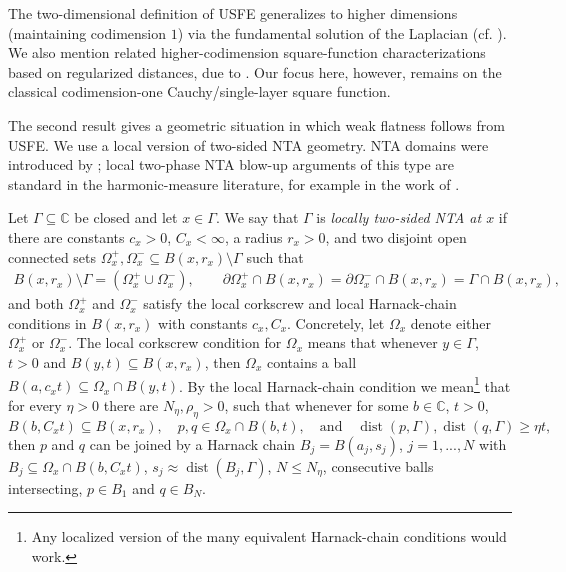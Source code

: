 \documentclass[11pt,a4paper,english,reqno]{amsart}
\numberwithin{equation}{section}
\newcommand{\CC}[0]{\mathbb{C}}
\renewcommand{\subset}{\subseteq}
\DeclareMathOperator{\dist}{dist}
\numberwithin{definition}{section}
\begin{document}
The two-dimensional definition of USFE generalizes to higher dimensions (maintaining codimension $1$) via the fundamental solution of the Laplacian (cf. \cite[Definition I.2.38]{davidAnalysisUniformlyRectifiable1993}).
We also mention related higher-codimension square-function characterizations based on regularized distances, due to \citeauthor{davidSquareFunctionsNontangential2021} \cite{davidSquareFunctionsNontangential2021}.
Our focus here, however, remains on the classical codimension-one Cauchy/single-layer square function.

The second result gives a geometric situation in which weak flatness follows from USFE.  We use a local version of two-sided NTA geometry.  NTA domains were introduced by \citeauthor{jerisonBoundaryBehaviorHarmonic1982} \cite{jerisonBoundaryBehaviorHarmonic1982}; local two-phase NTA blow-up arguments of this type are standard in the harmonic-measure literature, for example in the work of \citeauthor{kenigBoundaryStructureSize2009} \cite{kenigBoundaryStructureSize2009}.

\begin{definition}\label{def:local-two-sided-nta}
  Let $\Gamma\subset\CC$ be closed and let $x\in\Gamma$.  We say that $\Gamma$ is \emph{locally two-sided NTA at $x$} if there are constants $c_x>0$, $C_x<\infty$, a radius $r_x>0$, and two disjoint open connected sets $\Omega_x^+,\Omega_x^-\subset B(x,r_x)\setminus\Gamma$ such that
  \begin{align}
    B(x,r_x)\setminus\Gamma=(\Omega_x^+\cup\Omega_x^-),
    \qquad
    \partial\Omega_x^+\cap B(x,r_x)=\partial\Omega_x^-\cap B(x,r_x)=\Gamma\cap B(x,r_x),
  \end{align}
  and both $\Omega_x^+$ and $\Omega_x^-$ satisfy the local corkscrew and local Harnack-chain conditions in $B(x,r_x)$ with constants $c_x,C_x$.
  Concretely, let $Ω_x$ denote either $Ω_x^+$ or $Ω_x^-$.
  The local corkscrew condition for $Ω_x$ means that whenever \(y\in\Gamma\), $t>0$ and
  \(B(y,t)\subset B(x,r_x)\), then $Ω_x$ contains a ball $B(a,c_x t)\subset\Omega_x\cap B(y,t)$.
  By the local Harnack-chain condition we mean\footnote{Any localized version of the many equivalent Harnack-chain conditions would work.} that for every \(\eta>0\) there are \(N_\eta,\rho_\eta>0\), such that whenever for some $b\in\CC$, $t>0$,
  \[
    B(b,C_x t)\subset B(x,r_x), \quad
    p,q\in \Omega_x\cap B(b,t),
    \quad\text{and}\quad
    \dist(p,\Gamma),\dist(q,\Gamma)\ge \eta t,
  \]
  then \(p\) and \(q\) can be joined by a Harnack chain $B_j = B(a_j,s_j)$, $j=1,...,N$ with
  \(B_j \subset \Omega_x\cap B(b,C_x t)\), $s_j \approx \dist(B_j, Γ)$, \(N\le N_\eta\), consecutive balls intersecting, $p\in B_1$ and $q\in B_N$.
\end{definition}
\end{document}
